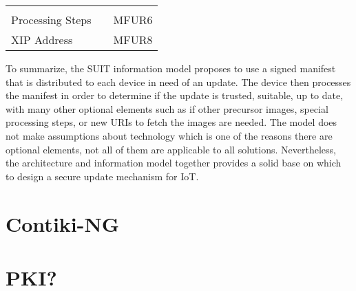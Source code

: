 \documentclass[0-thesis.tex]{subfiles}
\begin{document}
\begin{longtable}[]{@{}lll@{}}
\begin{minipage}[t]{0.23\columnwidth}
    \end{minipage}\tabularnewline
    \begin{minipage}[t]{0.32\columnwidth}\raggedright\strut Processing Steps\strut
    \end{minipage} & \begin{minipage}[t]{0.36\columnwidth}\raggedright\strut
    \strut
    \end{minipage} & \begin{minipage}[t]{0.23\columnwidth}\raggedright\strut MFUR6\strut
    \end{minipage}\tabularnewline
    \begin{minipage}[t]{0.32\columnwidth}\raggedright\strut XIP Address\strut
    \end{minipage} & \begin{minipage}[t]{0.36\columnwidth}\raggedright\strut
    \strut
    \end{minipage} & \begin{minipage}[t]{0.23\columnwidth}\raggedright\strut MFUR8\strut
    \end{minipage}\tabularnewline
    \bottomrule
\end{longtable}

To summarize, the SUIT information model proposes to use a signed manifest that is
distributed to each device in need of an update. The device then processes the manifest in
order to determine if the update is trusted, suitable, up to date, with many other
optional elements such as if other precursor images, special processing steps, or new URIs
to fetch the images are needed. The model does not make assumptions about technology which
is one of the reasons there are optional elements, not all of them are applicable to all
solutions. Nevertheless, the architecture and information model together provides a solid
base on which to design a secure update mechanism for IoT.

\section{Contiki-NG}
\label{ssec:contiki-ng}

\section{PKI?}
\label{ssec:pki}
\end{document}
